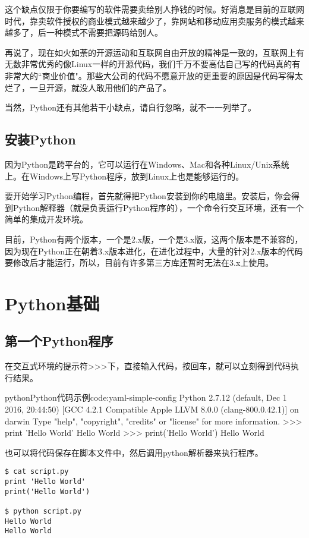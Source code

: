 这个缺点仅限于你要编写的软件需要卖给别人挣钱的时候。好消息是目前的互联网时代，靠卖软件授权的商业模式越来越少了，靠网站和移动应用卖服务的模式越来越多了，后一种模式不需要把源码给别人。

再说了，现在如火如荼的开源运动和互联网自由开放的精神是一致的，互联网上有无数非常优秀的像Linux一样的开源代码，我们千万不要高估自己写的代码真的有非常大的``商业价值"。那些大公司的代码不愿意开放的更重要的原因是代码写得太烂了，一旦开源，就没人敢用他们的产品了。

当然，Python还有其他若干小缺点，请自行忽略，就不一一列举了。

\subsection{安装Python}
因为Python是跨平台的，它可以运行在Windows、Mac和各种Linux/Unix系统上。在Windows上写Python程序，放到Linux上也是能够运行的。

要开始学习Python编程，首先就得把Python安装到你的电脑里。安装后，你会得到Python解释器（就是负责运行Python程序的），一个命令行交互环境，还有一个简单的集成开发环境。

目前，Python有两个版本，一个是2.x版，一个是3.x版，这两个版本是不兼容的，因为现在Python正在朝着3.x版本进化，在进化过程中，大量的针对2.x版本的代码要修改后才能运行，所以，目前有许多第三方库还暂时无法在3.x上使用。

\section{Python基础}
\subsection{第一个Python程序}
在交互式环境的提示符>>>下，直接输入代码，按回车，就可以立刻得到代码执行结果。
\begin{jcode}{python}{Python代码示例}{code:yaml-simple-config}
Python 2.7.12 (default, Dec  1 2016, 20:44:50) 
[GCC 4.2.1 Compatible Apple LLVM 8.0.0 (clang-800.0.42.1)] on darwin
Type "help", "copyright", "credits" or "license" for more information.
>>> print 'Hello World'
Hello World
>>> print('Hello World')
Hello World
\end{jcode}

也可以将代码保存在脚本文件中，然后调用python解析器来执行程序。
\begin{verbatim}
$ cat script.py
print 'Hello World'
print('Hello World')

$ python script.py
Hello World
Hello World
\end{verbatim}

